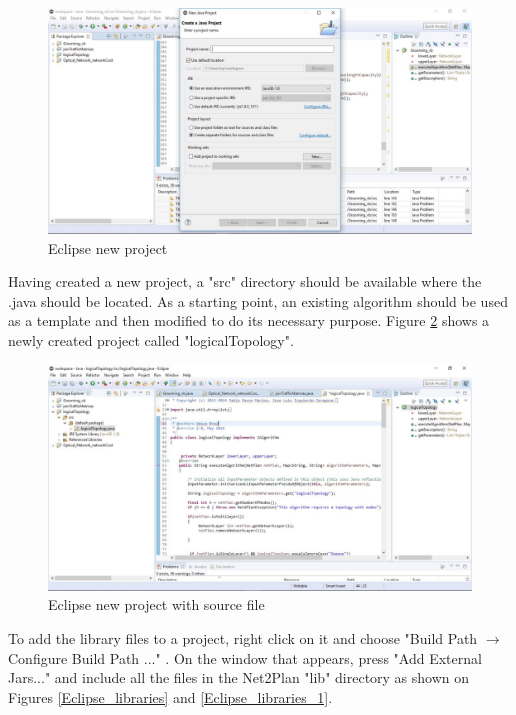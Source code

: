 	\vspace{1.5cm}
	\begin{figure}[h!]
		\centering
		\includegraphics[width = 13cm]{Eclipse_project.pdf}
		\caption{Eclipse new project}
		\label{Eclipse_project}
	\end{figure}	
	
	\newpage
	
	Having created a new project, a "src" directory should be available where the .java should be located. As a starting point, an existing algorithm should be used as a template and then modified to do its necessary purpose. Figure \ref{Eclipse_project_1} shows a newly created project called "logicalTopology".
	
	\vspace{1.5cm}
	\begin{figure}[h!]
		\centering
		\includegraphics[width = 13cm]{Eclipse_project_1.pdf}
		\caption{Eclipse new project with source file}
		\label{Eclipse_project_1}
	\end{figure}	
	
	To add the library files to a project, right click on it and choose "Build Path $\rightarrow$ Configure Build Path ..." . On the window that appears, press "Add External Jars..." and include all the files in the Net2Plan "lib" directory as shown on Figures \ref{Eclipse_libraries} and \ref{Eclipse_libraries_1}.
	
